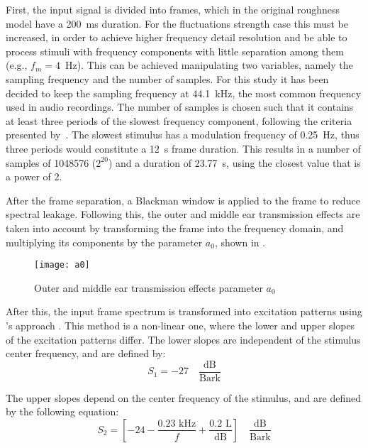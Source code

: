 \documentclass[../main.tex]{subfiles}
\begin{document}
\begin{modelchapter}
First, the input signal is divided into frames, which in the original roughness
model have a 200~ms duration. For the fluctuations strength case this must be
increased, in order to achieve higher frequency detail resolution and be able
to process stimuli with frequency components with little separation among them
(e.g., $f_m = 4$~Hz). This can be achieved manipulating two variables, namely
the sampling frequency and the number of samples. For this study it has been
decided to keep the sampling frequency at 44.1~kHz, the most common frequency
used in audio recordings. The number of samples is chosen such that it contains
at least three periods of the slowest frequency component, following the
criteria presented by~\textcite[pp.~97]{Boersma1993}. The slowest stimulus has a
modulation frequency of 0.25~Hz, thus three periods would constitute a 12~s
frame duration. This results in a number of samples of 1048576 ($2^{20}$) and a
duration of 23.77~s, using the closest value that is a power of 2.

After the frame separation, a Blackman window is applied to the frame to reduce
spectral leakage. Following this, the outer and middle ear transmission effects
are taken into account by transforming the frame into the frequency domain, and
multiplying its components by the parameter $a_0$, shown in .

\begin{figure}[!ht]
  \centering
  \texttt{[image: a0]}
  \caption{Outer and middle ear transmission effects parameter $a_0$}
\label{fig:a0}
\end{figure}

After this, the input frame spectrum is transformed into excitation patterns
using \citeauthor{Terhardt1979}'s approach \cite{Terhardt1979}. This method is a
non-linear one, where the lower and upper slopes of the excitation patterns
differ. The lower slopes are independent of the stimulus center frequency, and
are defined by:
\begin{equation}
  S_1 = -27 \quad \frac{\text{dB}}{\text{Bark}}
  \label{eq:lower_slopes}
\end{equation}

The upper slopes depend on the center frequency of the stimulus, and are defined
by the following equation:
\begin{equation}
  S_2 = [-24-\frac{0.23 \text{ kHz}}{f}+\frac{0.2 \text{ L}}{\text{dB}}]
  \quad
  \frac{\text{dB}}{\text{Bark}}
\end{equation}


\end{modelchapter}
\end{document}
